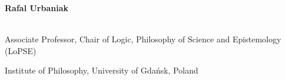 \documentclass[10pt, a4paper]{article}
\begin{document}


























{\sc 


\Large \textbf{Rafal Urbaniak}}\\[-5mm]

  
  
 
 \vspace{1mm} 
  Associate Professor, Chair of Logic, Philosophy of Science and Epistemology (LoPSE)
  
   Institute of Philosophy, University of Gda\' nsk, Poland  
 
\end{document}

